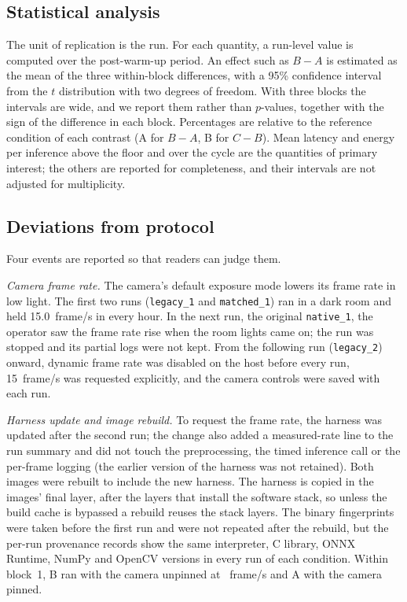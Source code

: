 \documentclass[10pt,journal,compsoc]{IEEEtran}
\begin{document}
\subsection{Statistical analysis}
The unit of replication is the run. For each quantity, a run-level value is computed over the post-warm-up period. An effect such as $B-A$ is estimated as the mean of the three within-block differences, with a 95\% confidence interval from the $t$ distribution with two degrees of freedom. With three blocks the intervals are wide, and we report them rather than $p$-values, together with the sign of the difference in each block. Percentages are relative to the reference condition of each contrast (A for $B-A$, B for $C-B$). Mean latency and energy per inference above the floor and over the cycle are the quantities of primary interest; the others are reported for completeness, and their intervals are not adjusted for multiplicity.

\subsection{Deviations from protocol}\label{sec:deviations}
Four events are reported so that readers can judge them.

\emph{Camera frame rate.} The camera's default exposure mode lowers its frame rate in low light. The first two runs (\texttt{legacy\_1} and \texttt{matched\_1}) ran in a dark room and held 15.0~frame/s in every hour. In the next run, the original \texttt{native\_1}, the operator saw the frame rate rise when the room lights came on; the run was stopped and its partial logs were not kept. From the following run (\texttt{legacy\_2}) onward, dynamic frame rate was disabled on the host before every run, 15~frame/s was requested explicitly, and the camera controls were saved with each run.

\emph{Harness update and image rebuild.} To request the frame rate, the harness was updated after the second run; the change also added a measured-rate line to the run summary and did not touch the preprocessing, the timed inference call or the per-frame logging (the earlier version of the harness was not retained). Both images were rebuilt to include the new harness. The harness is copied in the images' final layer, after the layers that install the software stack, so unless the build cache is bypassed a rebuild reuses the stack layers. The binary fingerprints were taken before the first run and were not repeated after the rebuild, but the per-run provenance records show the same interpreter, C library, ONNX Runtime, NumPy and OpenCV versions in every run of each condition. Within block~1, B ran with the camera unpinned at \FPSEarlyMax~frame/s and A with the camera pinned.
\end{document}
